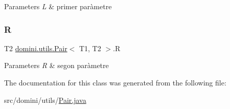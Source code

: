 \begin{DoxyParams}{Parameters}
{\em L} & primer paràmetre \\
\hline
\end{DoxyParams}
\mbox{\label{classdomini_1_1utils_1_1Pair_aebf54d48000999b84e5e24a2c62088d4}} 
\subsubsection{\texorpdfstring{R}{R}}
{\footnotesize\ttfamily T2 \hyperlink{classdomini_1_1utils_1_1Pair}{domini.\+utils.\+Pair}$<$ T1, T2 $>$.R}


\begin{DoxyParams}{Parameters}
{\em R} & segon paràmetre \\
\hline
\end{DoxyParams}


The documentation for this class was generated from the following file\+:\begin{DoxyCompactItemize}
\item 
src/domini/utils/\hyperlink{Pair_8java}{Pair.\+java}\end{DoxyCompactItemize}

